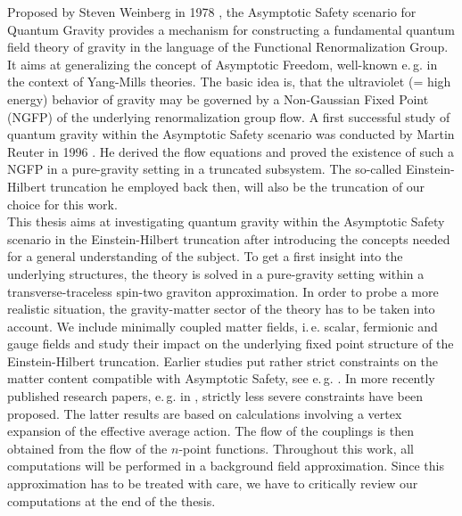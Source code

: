 Proposed by Steven Weinberg in 1978 \cite{Weinberg1980}, the Asymptotic Safety scenario for Quantum Gravity provides a mechanism for constructing a fundamental quantum field theory of gravity in the language of the Functional Renormalization Group. It aims at generalizing the concept of Asymptotic Freedom, well-known e.\,g. in the context of Yang-Mills theories. The basic idea is, that the ultraviolet (= high energy) behavior of gravity may be governed by a Non-Gaussian Fixed Point (NGFP) of the underlying renormalization group flow. A first successful study of quantum gravity within the Asymptotic Safety scenario was conducted by Martin Reuter in 1996 \cite{Reuter1996}. He derived the flow equations and proved the existence of such a NGFP in a pure-gravity setting in a truncated subsystem. The so-called Einstein-Hilbert truncation he employed back then, will also be the truncation of our choice for this work. \\
This thesis aims at investigating quantum gravity within the Asymptotic Safety scenario in the Einstein-Hilbert truncation after introducing the concepts needed for a general understanding of the subject. To get a first insight into the underlying structures, the theory is solved in a pure-gravity setting within a transverse-traceless spin-two graviton approximation. In order to probe a more realistic situation, the gravity-matter sector of the theory has to be taken into account. We include minimally coupled matter fields,  i.\,e. scalar, fermionic and gauge fields and study their impact on the underlying fixed point structure of the Einstein-Hilbert truncation. Earlier studies put rather strict constraints on the matter content compatible with Asymptotic Safety, see e.\,g. \cite{DonaEichhornPercacci2013}. In more recently published  research papers, e.\,g. in \cite{MeibohmPawlowskiReichert2015, ChristiansenLitimPawlowskiReichert2018}, strictly less severe constraints have been proposed. The latter results are based on calculations involving a vertex expansion of the effective average action. The flow of the couplings is then obtained from the flow of the $n$-point functions.
 Throughout this work, all computations will be performed in a background field approximation. Since this approximation has to be treated with care, we have to critically review our computations at the end of the thesis. \\
 
